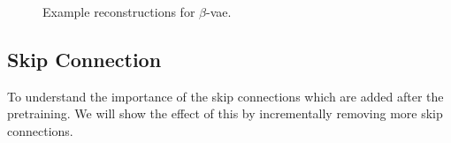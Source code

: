 \begin{figure}[!ht]
    \centering
    \caption{Example reconstructions for $\beta$-vae.}
    \label{fig:beta-vae-recon-examples}
     \quad
\end{figure}


\subsection{Skip Connection}
To understand the importance of the skip connections which are added after the pretraining. We will show the effect of this by incrementally removing more skip connections.

